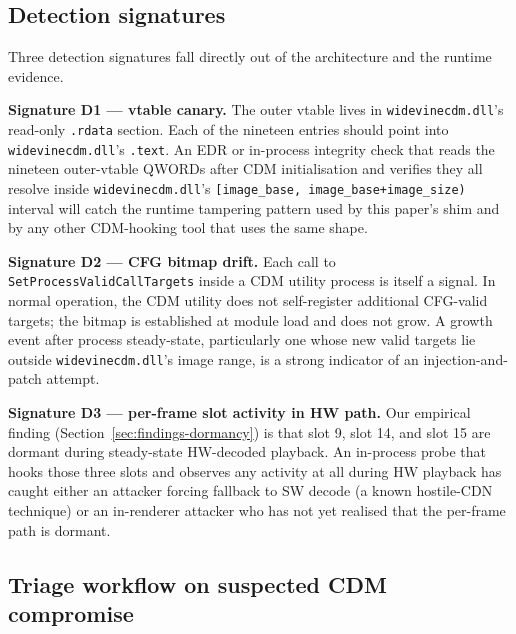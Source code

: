\documentclass[11pt,letterpaper]{article}
\begin{document}
\subsection{Detection signatures}

Three detection signatures fall directly out of the architecture
and the runtime evidence.

\textbf{Signature D1 --- vtable canary.}  The outer vtable lives in
\texttt{widevinecdm.dll}'s read-only \texttt{.rdata} section.  Each
of the nineteen entries should point into \texttt{widevinecdm.dll}'s
\texttt{.text}.  An EDR or in-process integrity check that reads
the nineteen outer-vtable QWORDs after CDM initialisation and
verifies they all resolve inside \texttt{widevinecdm.dll}'s
\texttt{[image\_base, image\_base+image\_size)} interval will catch
the runtime tampering pattern used by this paper's shim and by any
other CDM-hooking tool that uses the same shape.

\textbf{Signature D2 --- CFG bitmap drift.}  Each call to
\texttt{SetProcessValidCallTargets} inside a CDM utility process is
itself a signal.  In normal operation, the CDM utility does not
self-register additional CFG-valid targets; the bitmap is
established at module load and does not grow.  A growth event after
process steady-state, particularly one whose new valid targets lie
outside \texttt{widevinecdm.dll}'s image range, is a strong
indicator of an injection-and-patch attempt.

\textbf{Signature D3 --- per-frame slot activity in HW path.}  Our
empirical finding (Section~\ref{sec:findings-dormancy}) is that
slot 9, slot 14, and slot 15 are dormant during steady-state
HW-decoded playback.  An in-process probe that hooks those three
slots and observes any activity at all during HW playback has
caught either an attacker forcing fallback to SW decode (a known
hostile-CDN technique) or an in-renderer attacker who has not yet
realised that the per-frame path is dormant.

\subsection{Triage workflow on suspected CDM compromise}
\end{document}
